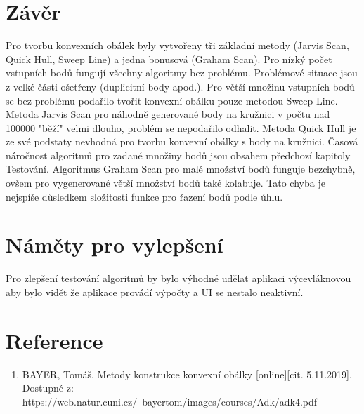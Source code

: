 \documentclass[a4paper, 12pt]{article}
\begin{document}
\section{Závěr}
Pro tvorbu konvexních obálek byly vytvořeny tři základní metody (Jarvis Scan, Quick Hull, Sweep Line) a jedna bonusová (Graham Scan). Pro nízký počet vstupních bodů fungují všechny algoritmy bez problému. Problémové situace jsou z velké části ošetřeny (duplicitní body apod.). Pro větší množinu vstupních bodů se bez problému podařilo tvořit konvexní obálku pouze metodou Sweep Line. Metoda Jarvis Scan pro náhodně generované body na kružnici v počtu nad 100000 "běží" velmi dlouho, problém se nepodařilo odhalit. Metoda Quick Hull je ze své podstaty nevhodná pro tvorbu konvexní obálky s body na kružnici. Časová náročnost algoritmů pro zadané množiny bodů jsou obsahem předchozí kapitoly Testování. Algoritmus Graham Scan pro malé množství bodů funguje bezchybně, ovšem pro vygenerované větší množství bodů také kolabuje. Tato chyba je nejspíše důsledkem složitosti funkce pro řazení bodů podle úhlu.

\section{Náměty pro vylepšení} 
Pro zlepšení testování algoritmů by bylo výhodné udělat aplikaci výcevláknovou aby bylo vidět že aplikace provádí výpočty a UI se nestalo neaktivní.

\section{Reference}

\begin{enumerate}

\item  BAYER, Tomáš. Metody konstrukce konvexní obálky [online][cit. 5.11.2019]. \\
Dostupné z: https://web.natur.cuni.cz/~bayertom/images/courses/Adk/adk4.pdf  \\

\end{enumerate}
\end{document}
